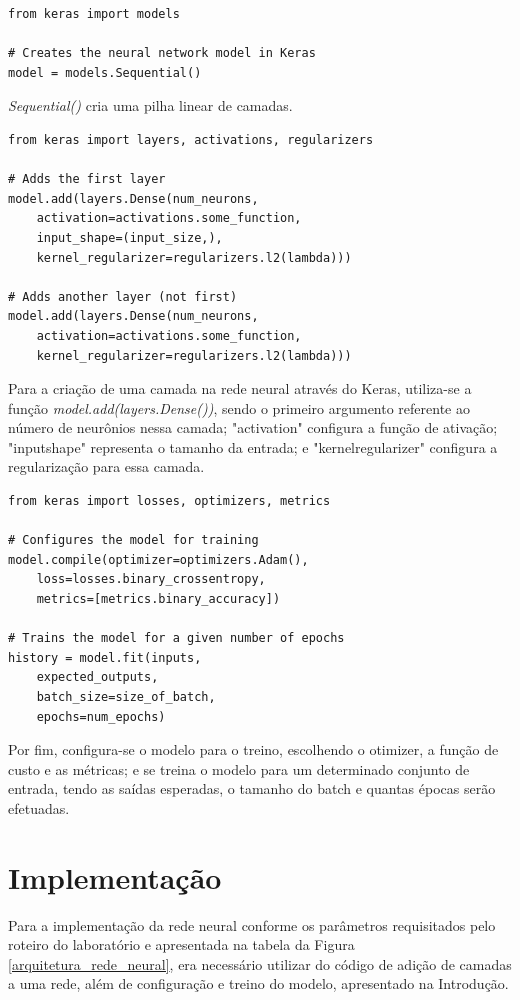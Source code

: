 \documentclass[conference]{IEEEtran}
\begin{document}
\begin{lstlisting}
from keras import models

# Creates the neural network model in Keras
model = models.Sequential()
\end{lstlisting}

\textit{Sequential()} cria uma pilha linear de camadas.

\begin{lstlisting}
from keras import layers, activations, regularizers

# Adds the first layer
model.add(layers.Dense(num_neurons,
	activation=activations.some_function,
	input_shape=(input_size,),
	kernel_regularizer=regularizers.l2(lambda)))

# Adds another layer (not first)
model.add(layers.Dense(num_neurons,
	activation=activations.some_function,
	kernel_regularizer=regularizers.l2(lambda)))
\end{lstlisting}

Para a criação de uma camada na rede neural através do Keras, utiliza-se a função \textit{model.add(layers.Dense())}, sendo o primeiro argumento referente ao número de neurônios nessa camada; "activation" configura a função de ativação; "input\underline{\space}shape" representa o tamanho da entrada; e "kernel\underline{\space}regularizer" configura a regularização para essa camada.

\begin{lstlisting}
from keras import losses, optimizers, metrics

# Configures the model for training
model.compile(optimizer=optimizers.Adam(),
	loss=losses.binary_crossentropy,
	metrics=[metrics.binary_accuracy])

# Trains the model for a given number of epochs
history = model.fit(inputs,
	expected_outputs,
	batch_size=size_of_batch,
	epochs=num_epochs)

\end{lstlisting}

Por fim, configura-se o modelo para o treino, escolhendo o otimizer, a função de custo e as métricas; e se treina o modelo para um determinado conjunto de entrada, tendo as saídas esperadas, o tamanho do batch e quantas épocas serão efetuadas.

\section{Implementação}
Para a implementação da rede neural conforme os parâmetros requisitados pelo roteiro do laboratório \cite{roteiro} e apresentada na tabela da Figura \ref{arquitetura_rede_neural}, era necessário utilizar do código de adição de camadas a uma rede, além de configuração e treino do modelo, apresentado na Introdução. 
\end{document}
